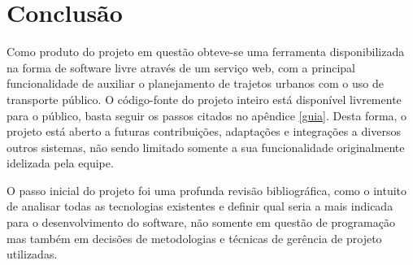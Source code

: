 \chapter{Conclusão}

Como produto do projeto em questão obteve-se uma ferramenta disponibilizada na forma de software livre através de um serviço web, com a principal funcionalidade de auxiliar o planejamento de trajetos urbanos com o uso de transporte público.
O código-fonte do projeto inteiro está disponível livremente para o público, basta seguir os passos citados no apêndice \ref{guia}.
Desta forma, o projeto está aberto a futuras contribuições, adaptações e integrações a diversos outros sistemas, não sendo limitado somente a sua funcionalidade originalmente idelizada pela equipe.




O passo inicial do projeto foi uma profunda revisão bibliográfica, como o intuito de analisar todas as tecnologias existentes e definir qual seria a mais indicada para o desenvolvimento do software, não somente em questão de programação mas também em decisões de metodologias e técnicas de gerência de projeto utilizadas.

